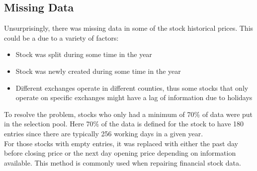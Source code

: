 \documentclass{article}
\begin{document}
\subsection{Missing Data}
Unsurprisingly, there was missing data in some of the stock historical prices. This could be a due to a variety of factors: 
\begin{itemize}
\item Stock was split during some time in the year
\item Stock was newly created during some time in the year
\item Different exchanges operate in different counties, thus some stocks that only operate on specific exchanges might have a lag of information due to holidays
\end{itemize}

To resolve the problem, stocks who only had a minimum of 70\% of data were put in the selection pool. Here 70\% of the data is defined for the stock to have 180 entries since there are typically 256 working days in a given year.\\

For those stocks with empty entries, it was replaced with either the past day before closing price or the next day opening price depending on information available. This method is commonly used when repairing financial stock data.  
\end{document}
